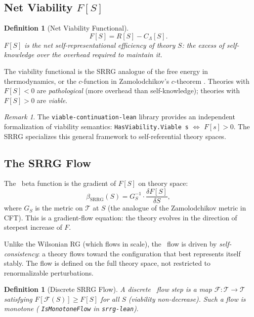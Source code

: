 \documentclass[11pt]{article}
\newtheorem{definition}[theorem]{Definition}
\theoremstyle{remark}
\newtheorem{remark}[theorem]{Remark}
\newcommand{\SRRG}{\text{SRRG}}
\newcommand{\lean}[1]{%
  \penalty-100
  \begingroup
  \def\_{\textunderscore\allowbreak}%
  \texttt{#1}%
  \endgroup
}
\begin{document}
\subsection{Net Viability $F[S]$}
\label{sec:viability}

\begin{definition}[Net Viability Functional]
\label{def:viability}
\begin{equation}
F[S] = R[S] - C_\Lambda[S].
\end{equation}
$F[S]$ is the \emph{net self-representational efficiency} of theory $S$:
the excess of self-knowledge over the overhead required to maintain it.
\end{definition}

The viability functional is the SRRG analogue of the free energy in thermodynamics,
or the $c$-function in Zamolodchikov's $c$-theorem \cite{ZamolodchikovCTheorem}.
Theories with $F[S] < 0$ are \emph{pathological} (more overhead than
self-knowledge); theories with $F[S] > 0$ are \emph{viable}.

\begin{remark}
The \lean{viable-continuation-lean} library provides an independent formalization
of viability semantics: \lean{HasViability.Viable s} $\Leftrightarrow$ $F[s] > 0$.
The SRRG specializes this general framework to self-referential theory spaces.
\end{remark}

\subsection{The SRRG Flow}
\label{sec:flow}

The \SRRG\ beta function is the gradient of $F[S]$ on theory space:
\begin{equation}
\label{eq:srrg_flow}
\beta_{\SRRG}(S) = G_S^{-1} \cdot \frac{\delta F[S]}{\delta S},
\end{equation}
where $G_S$ is the metric on $\mathcal{T}$ at $S$ (the analogue of the Zamolodchikov
metric in CFT). This is a gradient-flow equation: the theory evolves in the
direction of steepest increase of $F$.

Unlike the Wilsonian RG \cite{Wilson1971,Kadanoff1966} (which flows in scale), the \SRRG\ flow is driven by
\emph{self-consistency}: a theory flows toward the configuration that best
represents itself stably. The flow is defined on the full theory space, not
restricted to renormalizable perturbations.

\begin{definition}[Discrete SRRG Flow]
\label{def:flow_step}
A \emph{discrete \SRRG\ flow step} is a map $\mathcal{F}: \mathcal{T} \to \mathcal{T}$
satisfying $F[\mathcal{F}(S)] \geq F[S]$ for all $S$ (viability non-decrease).
Such a flow is \emph{monotone} (\lean{IsMonotoneFlow} in \texttt{srrg-lean}).
\end{definition}
\end{document}
